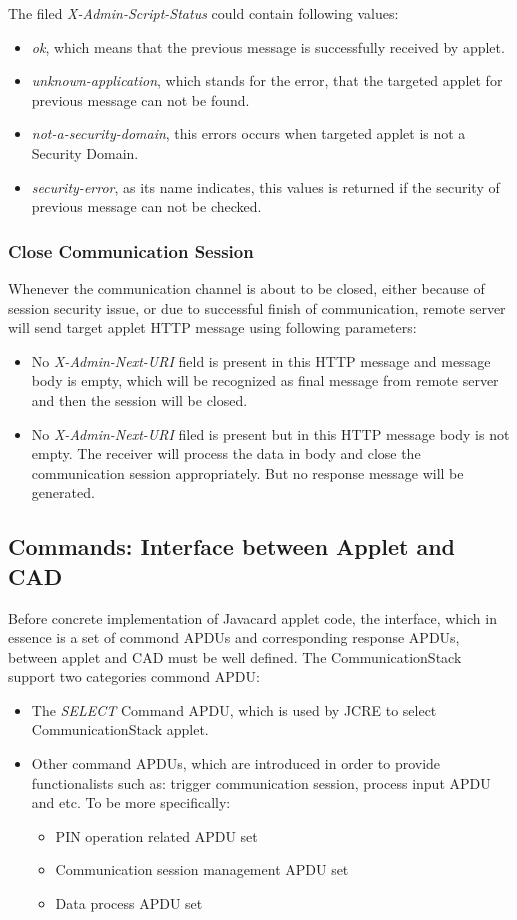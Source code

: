 The filed \emph{X-Admin-Script-Status} could contain following values:
 \begin{itemize}
  \item \emph{ok}, which means that the previous message is successfully received by applet.
  \item \emph{unknown-application}, which stands for the error, that the targeted applet for previous message can not be found.
\item \emph{not-a-security-domain}, this errors occurs when targeted applet is not a Security Domain.
\item \emph{security-error}, as its name indicates, this values is returned if the security of previous message  can not be checked.
\end{itemize}

\subsubsection{Close Communication Session}
Whenever the communication channel is about to be closed, either because of session security issue, or due to successful finish of communication, remote server will send target applet HTTP message using following parameters:
 \begin{itemize}
  \item No \emph{X-Admin-Next-URI} field is present in this HTTP message and message body is empty, which will be recognized as final message from remote server and then the session will be closed.
  \item No \emph{X-Admin-Next-URI} filed is present but in this HTTP message body is not empty. The receiver will process the data in body and close the communication session appropriately. But no response message will be generated.
\end{itemize}

\subsection {Commands: Interface between Applet and CAD} \label{secAPDU}
Before concrete implementation of Javacard applet code, the interface, which in essence is a set of commond APDUs and corresponding response APDUs, between applet and CAD must be well defined.  The CommunicationStack support two categories commond APDU:
 \begin{itemize}
  \item The \emph{SELECT} Command APDU, which is used by JCRE to select CommunicationStack applet.
  \item Other command APDUs, which are introduced in order to provide functionalists such as: trigger communication session, process input APDU and etc. To be more specifically:
\begin{itemize}
  \item PIN operation related APDU set
  \item Communication session management APDU set
  \item Data process APDU set
\end{itemize}
\end{itemize}

